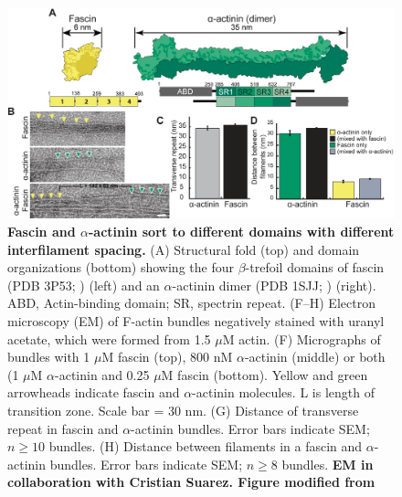\begin{figure}
\centering
\includegraphics[width=14cm]{img/ch03/Thesis_EM_fig.png}
\caption[Fascin and \texorpdfstring{$\alpha$}{alpha}-actinin sort to different domains with different interfilament spacing.]{\textbf{Fascin and $\alpha$-actinin sort to different domains with different interfilament spacing.} (A) Structural fold (top) and domain organizations (bottom) showing the four $\beta$-trefoil domains of fascin (PDB 3P53; \citep{jansen_mechanism_2011}) (left) and an $\alpha$-actinin dimer (PDB 1SJJ; \citep{liu_3-d_2004}) (right). ABD, Actin-binding domain; SR, spectrin repeat. (F–H) Electron microscopy (EM) of F-actin bundles negatively stained with uranyl acetate, which were formed from 1.5 $\mu$M actin. (F) Micrographs of bundles with 1 $\mu$M fascin (top), 800 nM $\alpha$-actinin (middle) or both (1 $\mu$M $\alpha$-actinin and 0.25 $\mu$M fascin (bottom). Yellow and green arrowheads indicate fascin and $\alpha$-actinin molecules. L is length of transition zone. Scale bar = 30 nm. (G) Distance of transverse repeat in fascin and $\alpha$-actinin bundles. Error bars indicate SEM; $n\geq10$ bundles. (H) Distance between filaments in a fascin and $\alpha$-actinin bundles. Error bars indicate SEM; $n\geq8$ bundles. \textbf{EM in collaboration with Cristian Suarez. Figure modified from \citep{winkelman_fascin-_2016}}}
\label{fig:em_fascin_aact}
\end{figure}

